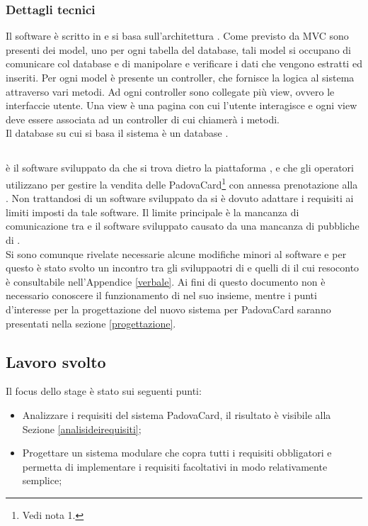 \subsubsection{Dettagli tecnici}
Il software è scritto in  e si basa sull'architettura . Come previsto da MVC sono presenti dei model, uno per ogni tabella del database, tali model si occupano di comunicare col database e di manipolare e verificare i dati che vengono estratti ed inseriti.
Per ogni model è presente un controller, che fornisce la logica al sistema attraverso vari metodi. Ad ogni controller sono collegate più view, ovvero le interfaccie utente. Una view è una pagina con cui l'utente interagisce e ogni view deve essere associata ad un controller di cui chiamerà i metodi.\\

Il database su cui si basa il sistema è un database .

\subsection{\tlite}
\tlite è il software sviluppato da \charta che si trova dietro la piattaforma \vivaticket, e che gli operatori utilizzano per gestire la vendita delle PadovaCard\footnote{Vedi nota 1.} con annessa prenotazione alla \cappella.
Non trattandosi di un software sviluppato da \net si è dovuto adattare i requisiti ai limiti imposti da tale software.
Il limite principale è la mancanza di comunicazione tra \tlite e il software sviluppato causato da una mancanza di  pubbliche di \tlite.\\

Si sono comunque rivelate necessarie alcune modifiche minori al software e per questo è stato svolto un incontro tra gli sviluppaotri di \tlite e quelli di \net il cui resoconto è consultabile nell'Appendice \ref{verbale}.
Ai fini di questo documento non è necessario conoscere il funzionamento di \tlite nel suo insieme, mentre i punti d'interesse per la progettazione del nuovo sistema per PadovaCard saranno presentati nella sezione \ref{progettazione}.

\subsection{Lavoro svolto}
Il focus dello stage è stato sui seguenti punti:
\begin{itemize}
\item Analizzare i requisiti del sistema PadovaCard, il risultato è visibile alla Sezione \ref{analisideirequisiti};
\item Progettare un sistema modulare che copra tutti i requisiti obbligatori e permetta di implementare i requisiti facoltativi in modo relativamente semplice;
\end{itemize}

